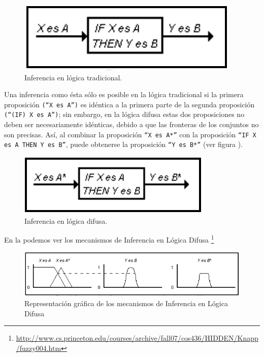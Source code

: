 \begin{figure}[H]
	\centering
	\includegraphics[scale=0.5]{images/logica_difusa.png}
	\caption{Inferencia en lógica tradicional.}
	\label{fig:inf}
\end{figure}

Una inferencia como ésta sólo es posible en
la lógica tradicional si la primera proposición \texttt{(``X es A'')} es idéntica a la
primera parte de la segunda proposición \texttt{(``(IF) X es A'')}; sin embargo, en la
lógica difusa estas dos proposiciones no deben ser necesariamente
idénticas, debido a que las fronteras de los conjuntos no son precisas. Así, al
combinar la proposición \texttt{``X es A*''} con la proposición \texttt{``IF X es A THEN Y es
B''}, puede obtenerse la proposición \texttt{``Y es B*''} (ver figura ).

\begin{figure}[H]
	\centering
	\includegraphics[scale=0.67]{images/logica_difusa_1.png}
	\caption{Inferencia en lógica difusa.}
	\label{fig:inf1}
\end{figure}

En la  podemos ver los mecanismos de Inferencia en Lógica Difusa \footnote{\url{http://www.cs.princeton.edu/courses/archive/fall07/cos436/HIDDEN/Knapp/fuzzy004.htm}}

\begin{figure}[H]
	\centering
	\includegraphics[scale=0.67]{images/mecanismos_inferencias_logica_difusa.png}
	\caption{Representación gráfica de los mecanismos de Inferencia en Lógica Difusa}
	\label{fig:inferencia}
\end{figure}

